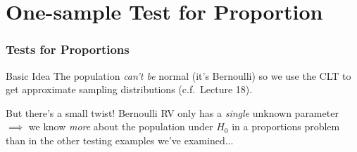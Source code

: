 \section{One-sample Test for Proportion}
\begin{frame}
	\frametitle{Tests for Proportions}
	\begin{block}
		{Basic Idea}
		The population \emph{can't be} normal (it's Bernoulli) so we use the CLT to get approximate sampling distributions (c.f.\ Lecture 18).
	\end{block}
	\begin{block}
		{But there's a small twist!}
		Bernoulli RV only has a \emph{single} unknown parameter $\implies$  we know \emph{more} about the population under $H_0$ in a proportions problem than in the other testing examples we've examined...	
	\end{block}


\end{frame}

